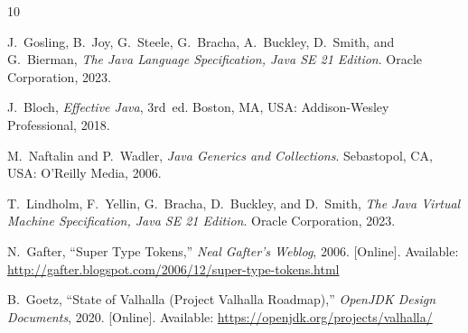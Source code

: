 \documentclass[10pt,journal,compsoc,onecolumn]{IEEEtran}
\begin{document}
\begin{thebibliography}{10}

J.~Gosling, B.~Joy, G.~Steele, G.~Bracha, A.~Buckley, D.~Smith, and G.~Bierman,
\emph{The Java Language Specification, Java SE 21 Edition}.
Oracle Corporation, 2023.

J.~Bloch,
\emph{Effective Java}, 3rd~ed.
Boston, MA, USA: Addison-Wesley Professional, 2018.

M.~Naftalin and P.~Wadler,
\emph{Java Generics and Collections}.
Sebastopol, CA, USA: O'Reilly Media, 2006.

T.~Lindholm, F.~Yellin, G.~Bracha, D.~Buckley, and D.~Smith,
\emph{The Java Virtual Machine Specification, Java SE 21 Edition}.
Oracle Corporation, 2023.

N.~Gafter,
``Super Type Tokens,''
\emph{Neal Gafter's Weblog}, 2006. [Online]. Available: \url{http://gafter.blogspot.com/2006/12/super-type-tokens.html}

B.~Goetz,
``State of Valhalla (Project Valhalla Roadmap),''
\emph{OpenJDK Design Documents}, 2020. [Online]. Available: \url{https://openjdk.org/projects/valhalla/}

\end{thebibliography}
\end{document}
